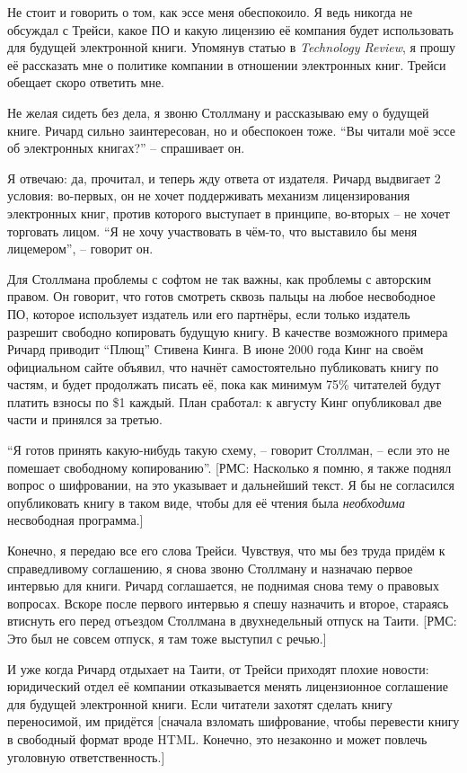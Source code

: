 Не стоит и говорить о том, как эссе меня обеспокоило. Я ведь никогда не обсуждал с Трейси, какое ПО и какую лицензию её компания будет использовать для будущей электронной книги. Упомянув статью в \textit{Technology Review}, я прошу её рассказать мне о политике компании в отношении электронных книг. Трейси обещает скоро ответить мне.

Не желая сидеть без дела, я звоню Столлману и рассказываю ему о будущей книге. Ричард сильно заинтересован, но и обеспокоен тоже. ``Вы читали моё эссе об электронных книгах?'' -- спрашивает он.

Я отвечаю: да, прочитал, и теперь жду ответа от издателя. Ричард выдвигает 2 условия: во-первых, он не хочет поддерживать механизм лицензирования электронных книг, против которого выступает в принципе, во-вторых -- не хочет торговать лицом. ``Я не хочу участвовать в чём-то, что выставило бы меня лицемером'', -- говорит он.

Для Столлмана проблемы с софтом не так важны, как проблемы с авторским правом. Он говорит, что готов смотреть сквозь пальцы на любое несвободное ПО, которое использует издатель или его партнёры, если только издатель разрешит свободно копировать будущую книгу. В качестве возможного примера Ричард приводит ``Плющ'' Стивена Кинга. В июне 2000 года Кинг на своём официальном сайте объявил, что начнёт самостоятельно публиковать книгу по частям, и будет продолжать писать её, пока как минимум 75\% читателей будут платить взносы по \$1 каждый. План сработал: к августу Кинг опубликовал две части и принялся за третью.

``Я готов принять какую-нибудь такую схему, -- говорит Столлман, -- если это не помешает свободному копированию''. [РМС: Насколько я помню, я также поднял вопрос о шифровании, на это указывает и дальнейший текст. Я бы не согласился опубликовать книгу в таком виде, чтобы для её чтения была \textit{необходима} несвободная программа.]

Конечно, я передаю все его слова Трейси. Чувствуя, что мы без труда придём к справедливому соглашению, я снова звоню Столлману и назначаю первое интервью для книги. Ричард соглашается, не поднимая снова тему о правовых вопросах. Вскоре после первого интервью я спешу назначить и второе, стараясь втиснуть его перед отъездом Столлмана в двухнедельный отпуск на Таити. [РМС: Это был не совсем отпуск, я там тоже выступил с речью.]

И уже когда Ричард отдыхает на Таити, от Трейси приходят плохие новости: юридический отдел её компании отказывается менять лицензионное соглашение для будущей электронной книги. Если читатели захотят сделать книгу переносимой, им придётся [сначала взломать шифрование, чтобы перевести книгу в свободный формат вроде HTML. Конечно, это незаконно и может повлечь уголовную ответственность.]

